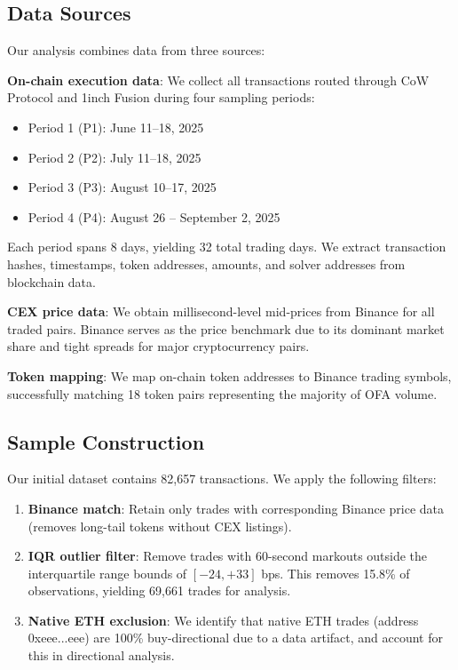 \documentclass[12pt,a4paper]{article}
\begin{document}
\subsection{Data Sources}

Our analysis combines data from three sources:

\textbf{On-chain execution data}: We collect all transactions routed through CoW Protocol and 1inch Fusion during four sampling periods:
\begin{itemize}
    \item Period 1 (P1): June 11--18, 2025
    \item Period 2 (P2): July 11--18, 2025
    \item Period 3 (P3): August 10--17, 2025
    \item Period 4 (P4): August 26 -- September 2, 2025
\end{itemize}

Each period spans 8 days, yielding 32 total trading days. We extract transaction hashes, timestamps, token addresses, amounts, and solver addresses from blockchain data.

\textbf{CEX price data}: We obtain millisecond-level mid-prices from Binance for all traded pairs. Binance serves as the price benchmark due to its dominant market share and tight spreads for major cryptocurrency pairs.

\textbf{Token mapping}: We map on-chain token addresses to Binance trading symbols, successfully matching 18 token pairs representing the majority of OFA volume.

\subsection{Sample Construction}

Our initial dataset contains 82,657 transactions. We apply the following filters:

\begin{enumerate}[leftmargin=*]
    \item \textbf{Binance match}: Retain only trades with corresponding Binance price data (removes long-tail tokens without CEX listings).

    \item \textbf{IQR outlier filter}: Remove trades with 60-second markouts outside the interquartile range bounds of $[-24, +33]$ bps. This removes 15.8\% of observations, yielding 69,661 trades for analysis.

    \item \textbf{Native ETH exclusion}: We identify that native ETH trades (address 0xeee...eee) are 100\% buy-directional due to a data artifact, and account for this in directional analysis.
\end{enumerate}
\end{document}
